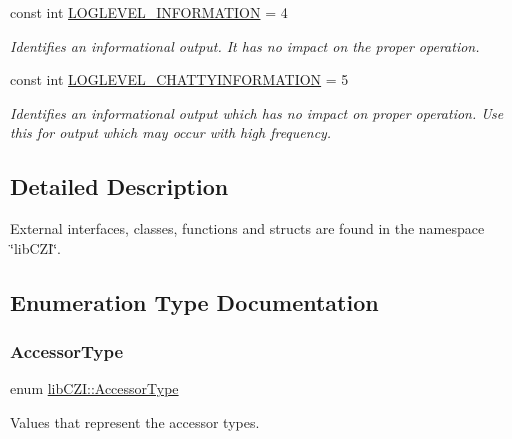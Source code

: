 \begin{DoxyCompactItemize}
const int \hyperlink{namespacelib_c_z_i_a16bb83f2e19fe08cc4edd0a43a4331f0}{L\+O\+G\+L\+E\+V\+E\+L\+\_\+\+I\+N\+F\+O\+R\+M\+A\+T\+I\+ON} = 4
\begin{DoxyCompactList}\small\item\em Identifies an informational output. It has no impact on the proper operation. \end{DoxyCompactList}\item 
\mbox{\label{namespacelib_c_z_i_ae6175e1c87b444693bb1a903ac28102e}} 
const int \hyperlink{namespacelib_c_z_i_ae6175e1c87b444693bb1a903ac28102e}{L\+O\+G\+L\+E\+V\+E\+L\+\_\+\+C\+H\+A\+T\+T\+Y\+I\+N\+F\+O\+R\+M\+A\+T\+I\+ON} = 5
\begin{DoxyCompactList}\small\item\em Identifies an informational output which has no impact on proper operation. Use this for output which may occur with high frequency. \end{DoxyCompactList}\end{DoxyCompactItemize}


\subsection{Detailed Description}
External interfaces, classes, functions and structs are found in the namespace \char`\"{}lib\+C\+Z\+I\char`\"{}. 

\subsection{Enumeration Type Documentation}
\mbox{\label{namespacelib_c_z_i_aa626474324df92c9cdc7258cdb1e677c}} 
\subsubsection{\texorpdfstring{Accessor\+Type}{AccessorType}}
{\footnotesize\ttfamily enum \hyperlink{namespacelib_c_z_i_aa626474324df92c9cdc7258cdb1e677c}{lib\+C\+Z\+I\+::\+Accessor\+Type}\hspace{0.3cm}{\ttfamily [strong]}}



Values that represent the accessor types. 

